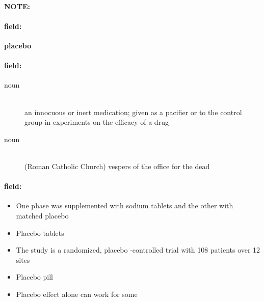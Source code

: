 \documentclass[12pt]{article}
\newenvironment{note}{\paragraph{NOTE:}}{}
\newenvironment{field}{\paragraph{field:}}{}
\begin{document}
\begin{note}
\begin{field}
\textbf{\large placebo}
\end{field}


\begin{field}
\begin{description}
\item[noun] \hfill \\ 
an innocuous or inert medication; given as a pacifier or to the control group in experiments on the efficacy of a drug

\item[noun] \hfill \\ 
(Roman Catholic Church) vespers of the office for the dead

\end{description}
\end{field}

\begin{field}
\begin{itemize}
\item One phase was supplemented with sodium tablets and the other with matched placebo
\item Placebo tablets
\item The study is a randomized, placebo -controlled trial with 108 patients over 12 sites
\item Placebo pill
\item Placebo effect alone can work for some
\end{itemize}
\end{field}
\end{note}
\end{document}
